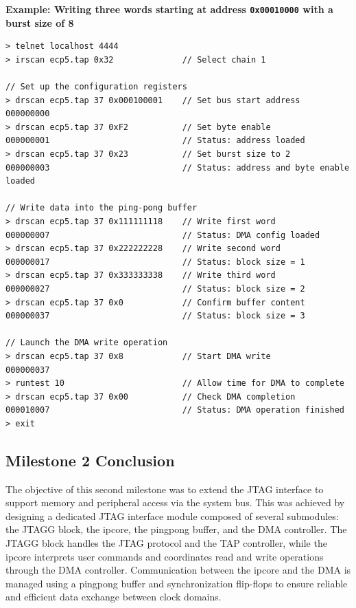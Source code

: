 \documentclass[a4paper,11pt,oneside]{report}
\begin{document}
\vspace{1em}
\noindent\textbf{Example: Writing three words starting at address \texttt{0x00010000} with a burst size of 8}
\begin{lstlisting}
> telnet localhost 4444
> irscan ecp5.tap 0x32              // Select chain 1

// Set up the configuration registers
> drscan ecp5.tap 37 0x000100001    // Set bus start address
000000000
> drscan ecp5.tap 37 0xF2           // Set byte enable
000000001                           // Status: address loaded
> drscan ecp5.tap 37 0x23           // Set burst size to 2
000000003                           // Status: address and byte enable loaded

// Write data into the ping-pong buffer
> drscan ecp5.tap 37 0x111111118    // Write first word
000000007                           // Status: DMA config loaded
> drscan ecp5.tap 37 0x222222228    // Write second word
000000017                           // Status: block size = 1
> drscan ecp5.tap 37 0x333333338    // Write third word
000000027                           // Status: block size = 2
> drscan ecp5.tap 37 0x0            // Confirm buffer content
000000037                           // Status: block size = 3

// Launch the DMA write operation
> drscan ecp5.tap 37 0x8            // Start DMA write
000000037
> runtest 10                        // Allow time for DMA to complete
> drscan ecp5.tap 37 0x00           // Check DMA completion
000010007                           // Status: DMA operation finished
> exit
\end{lstlisting}

\subsection{Milestone 2 Conclusion}

The objective of this second milestone was to extend the JTAG interface to support memory and peripheral access via the system bus.  
This was achieved by designing a dedicated JTAG interface module composed of several submodules: the JTAGG block, the ipcore, the pingpong buffer, and the DMA controller.  
The JTAGG block handles the JTAG protocol and the TAP controller, while the ipcore interprets user commands and coordinates read and write operations through the DMA controller.  
Communication between the ipcore and the DMA is managed using a pingpong buffer and synchronization flip-flops to ensure reliable and efficient data exchange between clock domains.
\end{document}
